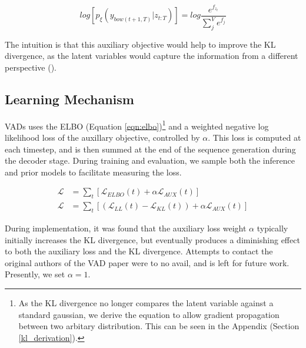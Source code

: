 \documentclass[12pt,twoside]{report}
\begin{document}
\begin{equation}
	log [p_\xi(y_{bow(t+1,T)}|z_{t:T}) ] = log  \frac{e^{f_{z_{t}}}}{\sum^V_j e^{f_{j}}}
\end{equation}

The intuition is that this auxiliary objective would help to improve the KL divergence, as the latent variables would capture the information from a different perspective (\cite{du_variational_2018}).

\subsection{Learning Mechanism}


VADs uses the ELBO (Equation \ref{eqn:elbo})\footnote{As the KL divergence no longer compares the latent variable against a standard gaussian, we derive the equation to allow gradient propagation between two arbitary distribution. This can be seen in the Appendix (Section \ref{kl_derivation}).} and a weighted negative log likelihood loss of the auxillary objective, controlled by $\alpha$. This loss is computed at each timestep, and is then summed at the end of the sequence generation during the decoder stage. During training and evaluation, we sample both the inference and prior models to facilitate measuring the loss.

\begin{equation}
	\begin{split}
		\mathcal{L} &= \sum_t [\mathcal{L}_{ELBO}(t) + \alpha \mathcal{L}_{AUX}(t)] \\
		\mathcal{L} &= \sum_t [(\mathcal{L}_{LL}(t) - \mathcal{L}_{KL}(t)) + \alpha \mathcal{L}_{AUX}(t)] 
	\end{split}
\end{equation}

During implementation, it was found that the auxiliary loss weight $\alpha$ typically initially increases the KL divergence, but eventually produces a diminishing effect to both the auxiliary loss and the KL divergence. Attempts to contact the original authors of the VAD paper were to no avail, and is left for future work. Presently, we set $\alpha=1$. 
 
\end{document}
